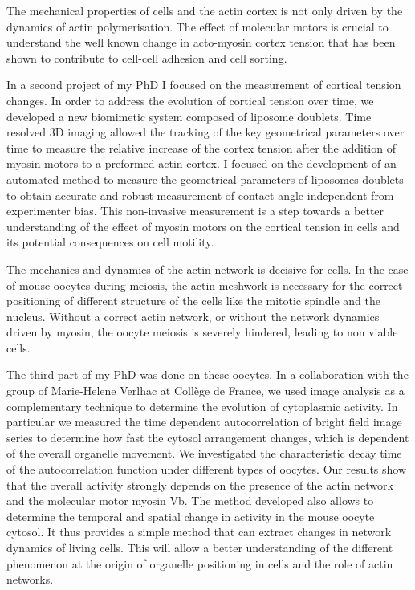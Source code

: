 \documentclass[A4paperpaper,11pt,english]{sphinxmanual}
\begin{document}
The mechanical properties  of cells and the  actin cortex is not  only driven
by the dynamics of actin polymerisation. The  effect of molecular motors is
crucial to understand the well known change  in acto-myosin cortex tension that
has been shown to contribute to cell-cell adhesion and cell sorting.

In a  second project of  my PhD  I focused  on the measurement  of
cortical tension changes.  In order  to address  the evolution  of cortical
tension over time, we developed  a new biomimetic system composed of  liposome
doublets. Time resolved 3D imaging  allowed the tracking of the key geometrical
parameters over time to measure  the relative increase of the cortex tension
after the addition of myosin motors to a preformed actin cortex. I focused on
the development of an automated method to measure the  geometrical parameters
of liposomes doublets to obtain  accurate  and  robust  measurement of  contact
angle  independent  from experimenter  bias. This  non-invasive measurement  is
a  step towards  a better understanding of  the effect of myosin  motors on the
cortical  tension in cells and its potential consequences on cell motility.

The mechanics and  dynamics of the actin  network is decisive for  cells. In
the case of  mouse oocytes during meiosis,  the actin meshwork is  necessary
for the correct positioning of different structure of the cells like the
mitotic spindle and  the nucleus.  Without  a  correct actin  network,  or
without the  network dynamics driven by  myosin, the oocyte meiosis is severely
hindered, leading to non viable cells.

The third part of my PhD was done  on these oocytes. In a collaboration with
the group of Marie-Helene Verlhac at Collège de  France, we used image analysis
as a complementary technique to  determine the evolution of  cytoplasmic
activity. In particular we measured the time  dependent autocorrelation of
bright field image series to determine how fast the cytosol arrangement
changes, which is dependent of the overall organelle movement. We investigated
the characteristic decay time of the  autocorrelation function under  different
types of oocytes.  Our results show that  the overall activity  strongly
depends on  the presence of  the actin network and  the molecular motor myosin
Vb. The method developed  also allows to determine  the temporal  and  spatial
change  in activity  in  the mouse  oocyte cytosol. It  thus provides a simple
method that can extract  changes in network dynamics  of  living cells.  This
will  allow  a  better understanding  of  the different phenomenon  at the
origin  of organelle  positioning in cells  and the role of actin networks.
\end{document}
